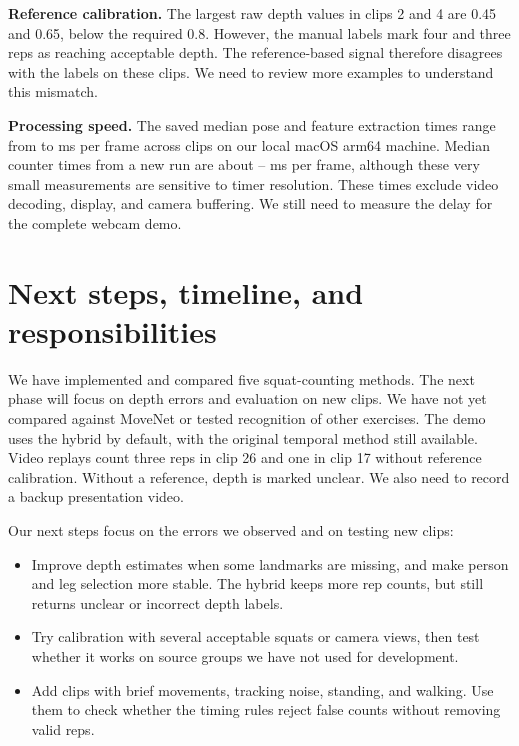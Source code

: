 \documentclass[10pt,letterpaper]{article}
\begin{document}
\textbf{Reference calibration.} The largest raw depth values in clips 2 and 4
are 0.45 and 0.65, below the required 0.8. However, the manual labels mark four
and three reps as reaching acceptable depth. The reference-based signal
therefore disagrees with the labels on these clips. We need to review more examples to understand this mismatch.

\textbf{Processing speed.} The saved median pose and feature extraction times
range from \ExtractMin{} to \ExtractMax{} ms per frame across clips on our local
macOS arm64 machine. Median counter times from a new run are about
\CounterMin{}--\CounterMax{} ms per frame, although these very small measurements
are sensitive to timer resolution. These times exclude video decoding,
display, and camera buffering. We still need to measure the delay for the
complete webcam demo.

\clearpage
\section{Next steps, timeline, and responsibilities}
We have implemented and compared five squat-counting methods. The next phase
will focus on depth errors and evaluation on new clips. We have not yet compared
against MoveNet or tested recognition of other exercises. The demo uses the
hybrid by default, with the original temporal method still available. Video
replays count three reps in clip 26 and one in clip 17 without reference
calibration. Without a reference, depth is marked unclear. We also need to
record a backup presentation video.

Our next steps focus on the errors we observed and on testing new clips:
\begin{itemize}
\item Improve depth estimates when some landmarks are missing, and make person
and leg selection more stable. The hybrid keeps more rep counts, but still
returns unclear or incorrect depth labels.
\item Try calibration with several acceptable squats or camera views, then test
whether it works on source groups we have not used for development.
\item Add clips with brief movements, tracking noise, standing, and walking.
Use them to check whether the timing rules reject false counts without
removing valid reps.
\end{itemize}
\end{document}
